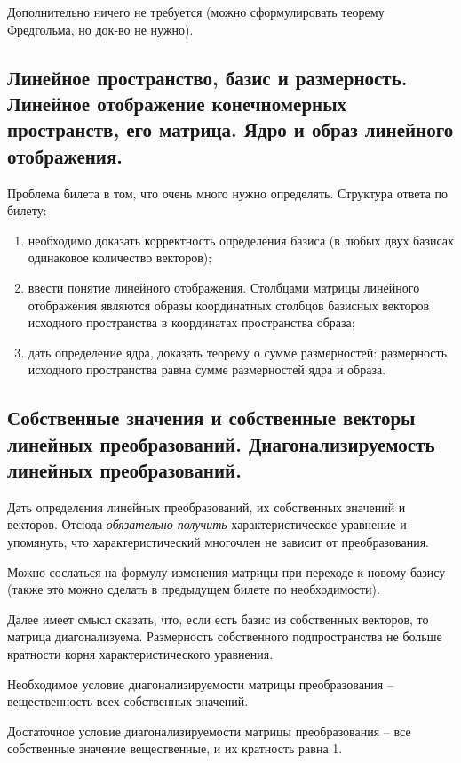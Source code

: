 Дополнительно ничего не требуется (можно сформулировать теорему Фредгольма, но док-во не нужно).

\subsection{Линейное пространство, базис и размерность. Линейное отображение конечномерных пространств, его матрица. Ядро и образ линейного отображения.}

Проблема билета в том, что очень много нужно определять. Структура ответа по билету:
\begin{enumerate}
    \item необходимо доказать корректность определения базиса (в любых двух базисах одинаковое количество векторов);
    \item ввести понятие линейного отображения. Столбцами матрицы линейного отображения являются образы координатных столбцов базисных векторов исходного пространства в координатах пространства образа;
    \item дать определение ядра, доказать теорему о сумме размерностей: размерность исходного пространства равна сумме размерностей ядра и образа.
\end{enumerate}

\subsection{Собственные значения и собственные векторы линейных преобразований. Диагонализируемость линейных преобразований.}

Дать определения линейных преобразований, их собственных значений и векторов. Отсюда \textit{обязательно получить} характеристическое уравнение и упомянуть, что характеристический многочлен не зависит от преобразования. 

Можно сослаться на формулу изменения матрицы при переходе к новому базису (также это можно сделать в предыдущем билете по необходимости).

Далее имеет смысл сказать, что, если есть базис из собственных векторов, то матрица диагонализуема. Размерность собственного подпространства не больше кратности корня характеристического уравнения.

Необходимое условие диагонализируемости матрицы преобразования -- вещественность всех собственных значений.

Достаточное условие диагонализируемости матрицы преобразования -- все собственные значение вещественные, и их кратность равна 1.

